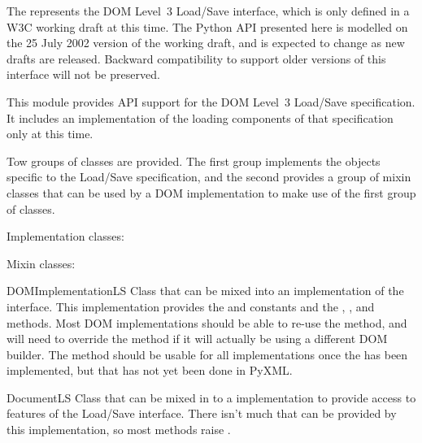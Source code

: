 \documentclass{howto}
\begin{document}

\begin{notice}[warning]
  The  represents the DOM Level~3 Load/Save
  interface, which is only defined in a W3C working draft at this
  time.  The Python API presented here is modelled on the 25 July 2002
  version of the working draft, and is expected to change as new
  drafts are released.  Backward compatibility to support older
  versions of this interface will not be preserved.
\end{notice}

This module provides API support for the DOM Level~3 Load/Save
specification.  It includes an implementation of the loading
components of that specification only at this time.

Tow groups of classes are provided.  The first group implements the
objects specific to the Load/Save specification, and the second
provides a group of mixin classes that can be used by a DOM
implementation to make use of the first group of classes.

Implementation classes:


Mixin classes:

\begin{classdesc*}{DOMImplementationLS}
  Class that can be mixed into an implementation of the
   interface.  This implementation provides
  the  and 
  constants and the ,
  , and 
  methods.  Most DOM implementations should be able to re-use the
   method, and will need to override
  the  method if it will actually be using
  a different DOM builder.  The  method
  should be usable for all implementations once the 
  has been implemented, but that has not yet been done in PyXML.
\end{classdesc*}

\begin{classdesc*}{DocumentLS}
  Class that can be mixed in to a  implementation to
  provide access to features of the Load/Save interface.  There isn't
  much that can be provided by this implementation, so most methods
  raise .
\end{classdesc*}
\end{document}
